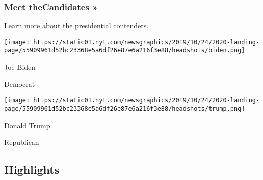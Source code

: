 \hypertarget{meet-thecandidates-}{%
\subsubsection{\texorpdfstring{\href{https://www.nytimes.com/interactive/2019/us/politics/2020-presidential-candidates.html}{Meet
the}\href{https://www.nytimes.com/interactive/2019/us/politics/2020-presidential-candidates.html}{C}\href{https://www.nytimes.com/interactive/2019/us/politics/2020-presidential-candidates.html}{andidates}
»}{Meet theCandidates »}}\label{meet-thecandidates-}}

Learn more about the presidential contenders.

\href{https://www.nytimes.com/interactive/2020/us/elections/joe-biden.html}{}

\texttt{[image: https://static01.nyt.com/newsgraphics/2019/10/24/2020-landing-page/55909961d52bc23368e5a6df26e87e6a216f3e88/headshots/biden.png]}

Joe Biden

Democrat

\href{https://www.nytimes.com/interactive/2020/us/elections/donald-trump.html}{}

\texttt{[image: https://static01.nyt.com/newsgraphics/2019/10/24/2020-landing-page/55909961d52bc23368e5a6df26e87e6a216f3e88/headshots/trump.png]}

Donald Trump

Republican

\hypertarget{highlights}{%
\subsection{Highlights}\label{highlights}}

